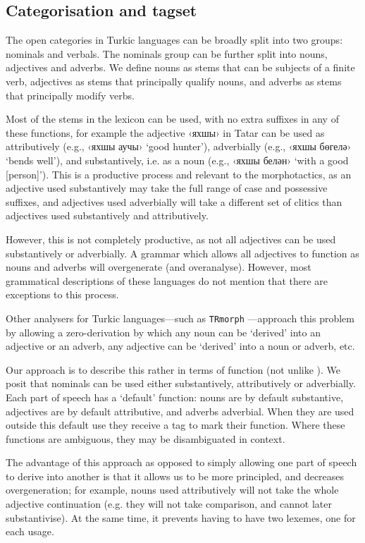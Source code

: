\documentclass[a4paper,11pt,twocolumn]{article}
\begin{document}
\subsection{Categorisation and tagset}

The open categories in Turkic languages can be broadly split into two groups: nominals
and verbals. The nominals group can be further split into nouns, adjectives and adverbs.
We define nouns as stems that can be subjects of a finite verb, adjectives as stems that principally qualify 
nouns, and adverbs as stems that principally modify verbs.

Most of the stems in the lexicon can be used, with no extra suffixes in any of these functions, for 
example the adjective ‹яхшы› in Tatar can be used as attributively (e.g., ‹яхшы аучы› `good hunter'), adverbially
(e.g., ‹яхшы бөгелә› `bends well'), and substantively, i.e. as a noun (e.g., ‹яхшы белән› `with a good [person]’). This
is a productive process and relevant to the morphotactics, as an adjective used substantively may take the 
full range of case and possessive suffixes, and adjectives used adverbially will take a different set of 
clitics than adjectives used substantively and attributively. 

However, this is not completely productive, as not all adjectives can be used substantively or adverbially. A grammar which allows all adjectives to function
as nouns and adverbs will overgenerate (and overanalyse). However, most grammatical descriptions of these languages do not 
mention that there are exceptions to this process.

Other analysers for Turkic languages---such as \texttt{TRmorph} \citep{coltekin2010}---approach this 
problem by allowing a zero-derivation by which any noun can be `derived' into an adjective or 
an adverb, any adjective can be `derived' into a noun or adverb, etc. 

Our approach is to describe this rather in terms of function (not unlike \cite{hengeveld92}). We 
posit that nominals can be used either substantively, attributively or adverbially. Each part of speech 
has a `default' function: nouns are by default substantive, adjectives are by default attributive, 
and adverbs adverbial. When they are used outside this default use they receive a tag to mark 
their function. Where these functions are ambiguous, they may be disambiguated 
in context. 

The advantage of this approach as opposed to simply allowing one part of speech to derive into
another is that it allows us to be more principled, and decreases overgeneration;
for example, nouns used attributively will not take the whole adjective continuation (e.g.
they will not take comparison, and cannot later substantivise). At the same time, it prevents 
having to have two lexemes, one for each usage.
\end{document}
